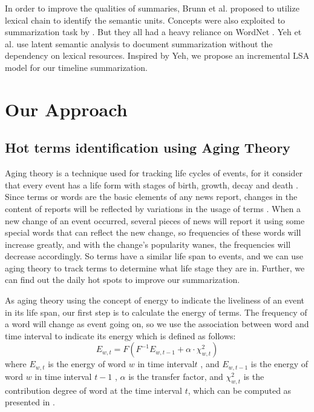 \documentclass[runningheads,a4paper]{llncs}
\begin{document}
In order to improve the qualities of summaries, Brunn et al. \cite{2001-Brunn-p-} proposed to utilize lexical chain to identify the semantic units. Concepts were also exploited to summarization task by \cite{2007-Ye-p1643-1662}. But they all had a heavy reliance on WordNet \cite{1990-Miller-p235-244}. Yeh et al. \cite{2001-Gong-p19-25} use latent semantic analysis to document summarization without the dependency on lexical resources. Inspired by Yeh, we propose an incremental LSA model for our timeline summarization. 


\section{Our Approach}

\subsection{Hot terms identification using Aging Theory}

Aging theory is a technique used for tracking life cycles of events, for it consider that every event has a life form with stages of birth, growth, decay and death \cite{2003-Chen-p47-59}. Since terms or words are the basic elements of any news report, changes in the content of reports will be reflected by variations in the usage of terms \cite{2007-Chen-p1016-1025}. When a new change of an event occurred, several pieces of news will report it using some special words that can reflect the new change, so frequencies of these words will increase greatly, and with the change’s popularity wanes, the frequencies will decrease accordingly. So terms have a similar life span to events, and we can use aging theory to track terms to determine what life stage they are in. Further, we can find out the daily hot spots to improve our summarization.

As aging theory using the concept of energy to indicate the liveliness of an event in its life span, our first step is to calculate the energy of terms. The frequency of a word will change as event going on, so we use the association between word  and time interval  to indicate its energy which is defined as follows:
\begin{equation}
  E_{w,t} =F(F^{-1}E_{w,t-1}+\alpha\cdot\chi^2_{w,t})
\end{equation}
where $E_{w,t}$ is the energy of word $w$  in time interval$t$ , and $E_{w,t-1}$  is the energy of word $w$ in time interval $t-1$ , $\alpha$ is the transfer factor, and $\chi^2_{w,t}$  is the contribution degree of word  at the time interval $t$, which can be computed as presented in \cite{2000-Swan-p49-56}. 
\end{document}
